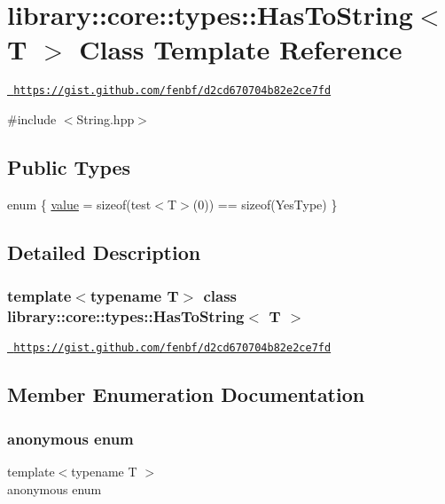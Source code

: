 \hypertarget{classlibrary_1_1core_1_1types_1_1_has_to_string}{}\section{library\+::core\+::types\+::Has\+To\+String$<$ T $>$ Class Template Reference}
\label{classlibrary_1_1core_1_1types_1_1_has_to_string}


\href{https://gist.github.com/fenbf/d2cd670704b82e2ce7fd}{\texttt{ https\+://gist.\+github.\+com/fenbf/d2cd670704b82e2ce7fd}}  




{\ttfamily \#include $<$String.\+hpp$>$}

\subsection*{Public Types}
\begin{DoxyCompactItemize}
\item 
enum \{ \mbox{\hyperlink{classlibrary_1_1core_1_1types_1_1_has_to_string_a66718ae4c4783afe3e8137ddbd6689afaec23beac9fd1e1c74d43c6242f649acc}{value}} = sizeof(test$<$T$>$(0)) == sizeof(Yes\+Type)
 \}
\end{DoxyCompactItemize}


\subsection{Detailed Description}
\subsubsection*{template$<$typename T$>$\newline
class library\+::core\+::types\+::\+Has\+To\+String$<$ T $>$}

\href{https://gist.github.com/fenbf/d2cd670704b82e2ce7fd}{\texttt{ https\+://gist.\+github.\+com/fenbf/d2cd670704b82e2ce7fd}} 

\subsection{Member Enumeration Documentation}
\mbox{\label{classlibrary_1_1core_1_1types_1_1_has_to_string_a66718ae4c4783afe3e8137ddbd6689af}} 
\subsubsection{\texorpdfstring{anonymous enum}{anonymous enum}}
{\footnotesize\ttfamily template$<$typename T $>$ \\
anonymous enum}

